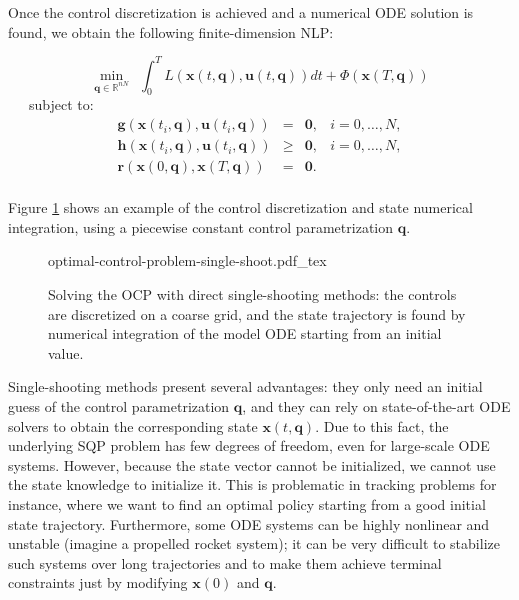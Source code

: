 Once the control discretization is achieved and a numerical ODE
solution is found, we obtain the following finite-dimension NLP:

\begin{equation}
  \min_{\mathbf{q}\in\mathbb R^{nN}} \ \ \int_{0}^{T}L (\mathbf{x}(t,\mathbf{q}),
  \mathbf{u}(t,\mathbf{q}))dt + \Phi(\mathbf{x}(T,\mathbf{q}))
\end{equation}
\ \ \ subject to:
\begin{equation}
  \begin{array}{rclr}
  \mathbf{g}(\mathbf{x}(t_i,\mathbf{q}), \mathbf{u}(t_i,\mathbf{q})) & = & \mathbf{0}, & i=0,\ldots,N,%
  \\%
  \mathbf{h}(\mathbf{x}(t_i,\mathbf{q}), \mathbf{u}(t_i,\mathbf{q})) & \ge & \mathbf{0}, & i=0,\ldots,N,%
  \\%
  \mathbf{r} (\mathbf{x}(0,\mathbf{q}), \mathbf{x}(T,\mathbf{q})) & = & \mathbf{0}.%
  \\%
  \end{array}
\end{equation} 

Figure \ref{fig:chap3-optimal-control-problem-single-shoot} shows an
example of the control discretization and state numerical integration,
using a piecewise constant control parametrization $\mathbf{q}$.

\begin{figure}
  \centering
      {\def\svgwidth{0.9\linewidth}
        
                   {optimal-control-problem-single-shoot.pdf_tex}
      }
      \caption{Solving the OCP with direct single-shooting methods:
        the controls are discretized on a coarse grid, and the state
        trajectory is found by numerical integration of the model ODE
        starting from an initial value.}
      \label{fig:chap3-optimal-control-problem-single-shoot}
\end{figure}

Single-shooting methods present several advantages: they only need an
initial guess of the control parametrization $\mathbf{q}$, and they
can rely on state-of-the-art ODE solvers to obtain the corresponding
state $\mathbf{x}(t,\mathbf{q})$. Due to this fact, the underlying SQP
problem has few degrees of freedom, even for large-scale ODE
systems. However, because the state vector cannot be initialized, we
cannot use the state knowledge to initialize it. This is problematic
in tracking problems for instance, where we want to find an optimal
policy starting from a good initial state trajectory. Furthermore,
some ODE systems can be highly nonlinear and unstable (imagine a
propelled rocket system); it can be very difficult to stabilize such
systems over long trajectories and to make them achieve terminal
constraints just by modifying $\mathbf{x}(0)$ and $\mathbf{q}$.

